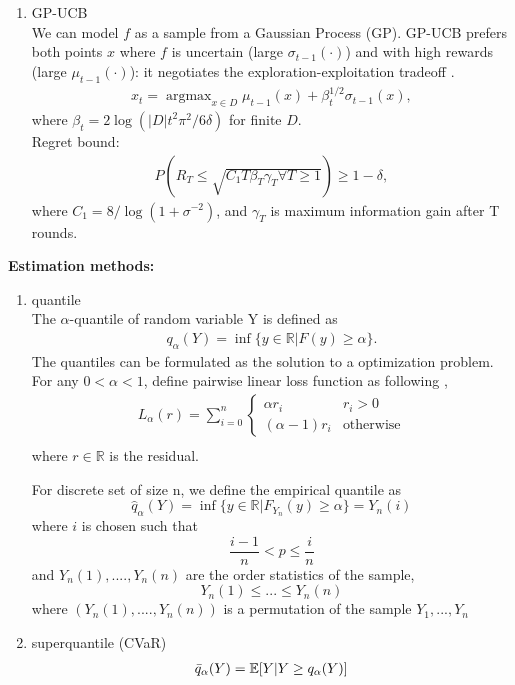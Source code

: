 \documentclass[11pt]{article}
\DeclareMathOperator*{\argmax}{argmax}
\begin{document}
\begin{enumerate}
    \begin{enumerate}
        \item GP-UCB\\
        We can model $f$ as a sample from a Gaussian Process (GP). GP-UCB prefers both points $x$ where $f$ is uncertain (large $\sigma_{t-1} (\cdot)$) and with high rewards (large $\mu_{t-1}(\cdot)$): it negotiates the exploration-exploitation tradeoff \cite{srinivas2012}.
        \begin{align}
            x_t = \argmax_{x \in D} \mu_{t-1} (x) + \beta_t^{1/2} \sigma_{t-1} (x),
        \end{align}
        where $\beta_t = 2 \log (|D|t^2\pi^2/6 \delta)$ for finite $D$.\\
        
        Regret bound:
        \begin{align}
            P (R_T \leq \sqrt{C_1T\beta_T \gamma_T \forall T \geq 1}) \geq 1 - \delta,
        \end{align}
        where $C_1 = 8/\log(1 + \sigma^{-2})$, and $\gamma_T$ is maximum information gain after T rounds.
    \end{enumerate}
    
\textbf{Estimation methods:}
\begin{enumerate}
    \item quantile\\
        The $\alpha$-quantile of random variable Y is defined as
        \begin{align}
            q_\alpha(Y) = \inf\{y \in \mathbb{R}| F(y) \geq \alpha\}.
        \end{align}
        The quantiles can be formulated as the solution to a optimization problem. For any $0 < \alpha < 1$, define pairwise linear loss function as following \cite{koenker2001quantile},
        \begin{align}
            L_\alpha(r) = \sum_{i = 0}^n \begin{cases}
            \alpha r_i & r_i > 0\\
            (\alpha - 1) r_i & \text{otherwise}
            \end{cases}\\
        \end{align}
        where $r \in \mathbb{R}$ is the residual.
        
        For discrete set of size n, we define the empirical quantile as
        $$\hat{q}_\alpha(Y) = \inf \{y \in \mathbb{R}| F_{Y_n} (y) \geq \alpha\} = Y_n(i)$$
        where $i$ is chosen such that
        $$\frac{i-1}{n} < p \leq \frac{i}{n}$$
        and $Y_n(1), ...., Y_n(n)$ are the order statistics of the sample,
        $$Y_n(1)\leq ...\leq Y_n(n)$$ 
        where $(Y_n(1), ...., Y_n(n))$ is a permutation of the sample $Y_1, ..., Y_n$
    \item superquantile (CVaR)
    \begin{align}
    \Bar{q}_\alpha(Y) = \mathbb{E}[Y|Y \geq q_\alpha(Y)]
\end{align}
\end{enumerate}


\end{enumerate}
\end{document}
